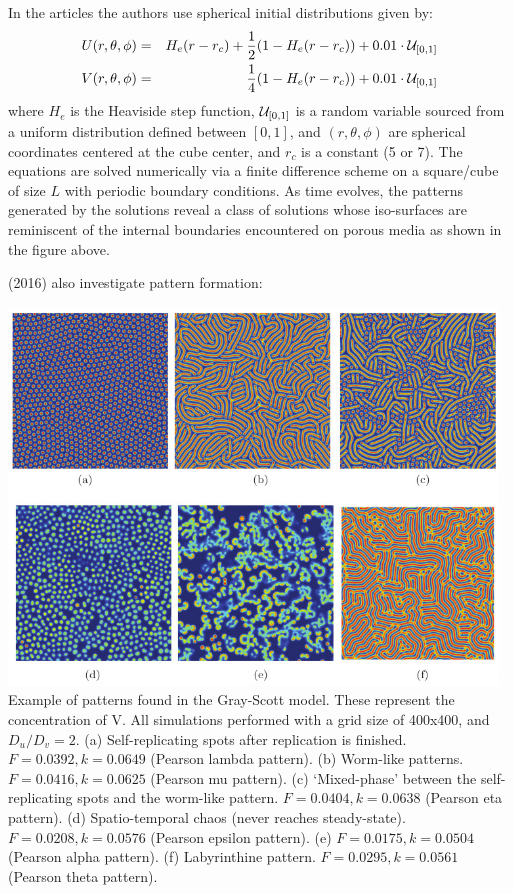 In the articles the authors use spherical initial distributions given by:
\begin{eqnarray}
U(r,\theta,\phi) &=& H_e(r-r_c) +\frac12 (1-H_e(r-r_c)) + 0.01 \cdot {\cal U}_{[0,1]} \nonumber\\
V(r,\theta,\phi) &=& \frac14 (1-H_e(r-r_c)) + 0.01 \cdot {\cal U}_{[0,1]}
\end{eqnarray}
where $H_e$ is the Heaviside step function, ${\cal U}_{[0,1]}$ is a random variable sourced from a 
uniform distribution defined between $[0,1]$, and $(r,\theta,\phi)$ are spherical coordinates centered at
the cube center, and $r_c$ is a constant (5 or 7).
The equations are solved numerically via a finite difference scheme on a square/cube of size $L$
with periodic boundary conditions. As time evolves, the patterns generated by
the solutions reveal a class of solutions whose iso-surfaces are reminiscent of the internal
boundaries encountered on porous media as shown in the figure above.

\textcite{haqh16} (2016) also investigate pattern formation:
\begin{center}
\includegraphics[width=13cm]{python_codes/fieldstone_171/images/haqh16}\\
{\captionfont 
Example of patterns found in the Gray-Scott model. These represent
the concentration of V. All simulations performed with a grid size of 400x400,
and $D_u/D_v=2$. 
(a) Self-replicating spots after replication is ﬁnished. $F=0.0392,k=0.0649$ (Pearson lambda pattern). 
(b) Worm-like patterns. $F=0.0416,k=0.0625$ (Pearson mu pattern). 
(c) `Mixed-phase' between the self-replicating spots and the worm-like pattern. $F=0.0404,k=0.0638$ (Pearson eta pattern). 
(d) Spatio-temporal chaos (never reaches steady-state). $F=0.0208,k=0.0576$ (Pearson epsilon pattern).
(e) $F=0.0175,k=0.0504$ (Pearson alpha pattern). 
(f) Labyrinthine pattern. $F=0.0295,k=0.0561$ (Pearson theta pattern).}
\end{center}



